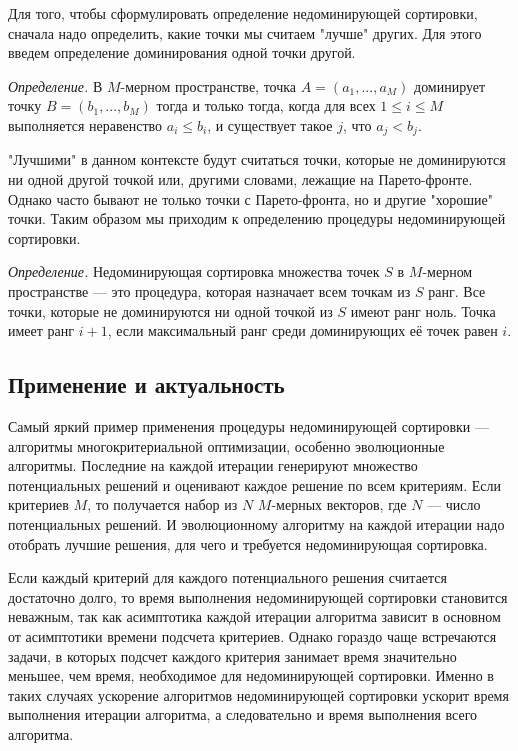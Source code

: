 Для того, чтобы сформулировать определение недоминирующей сортировки, сначала надо определить, какие точки мы считаем
"лучше" других. Для этого введем определение доминирования одной точки другой.

\textit{Определение.} В $M$-мерном пространстве, точка $A = (a_1,...,a_M)$ доминирует точку $B = (b_1,...,b_M)$
 тогда и только тогда, когда для всех $1 \leq i \leq M$ выполняется неравенство $a_i\leq b_i$, и существует такое $j$,
 что $a_j < b_j$.

"Лучшими" в данном контексте будут считаться точки, которые не доминируются ни одной другой точкой или, другими словами,
лежащие на Парето-фронте. Однако часто бывают не только точки с Парето-фронта, но и другие "хорошие" точки. Таким
образом мы приходим к определению процедуры недоминирующей сортировки.

\textit{Определение.} Недоминирующая сортировка множества точек $S$ в $M$-мерном пространстве {---} это процедура, которая
назначает всем точкам из $S$ ранг. Все точки, которые не доминируются ни одной точкой из $S$ имеют ранг ноль. Точка
имеет ранг $i+1$, если максимальный ранг среди доминирующих её точек равен $i$.

\subsection{Применение и актуальность}

Самый яркий пример применения процедуры недоминирующей сортировки {---} алгоритмы многокритериальной оптимизации, особенно эволюционные алгоритмы. Последние на каждой итерации генерируют множество потенциальных решений и оценивают каждое решение по всем критериям. Если критериев $M$, то получается набор из $N$ $M$-мерных векторов, где $N$ {---} число потенциальных решений. И эволюционному алгоритму на каждой итерации надо отобрать лучшие решения, для чего и требуется недоминирующая сортировка.

Если каждый критерий для каждого потенциального решения считается достаточно долго, то время выполнения недоминирующей сортировки становится неважным, так как асимптотика каждой итерации алгоритма зависит в основном от асимптотики времени подсчета критериев. Однако гораздо чаще встречаются задачи, в которых подсчет каждого критерия занимает время значительно меньшее, чем время, необходимое для недоминирующей сортировки. Именно в таких случаях ускорение алгоритмов недоминирующей сортировки ускорит время выполнения итерации алгоритма, а следовательно и время выполнения всего алгоритма.

